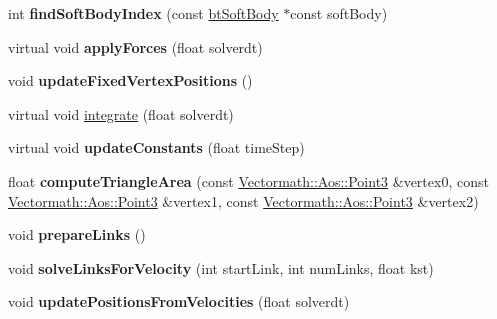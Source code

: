 \begin{DoxyCompactItemize}
\mbox{\label{classbtOpenCLSoftBodySolver_ab9279cc2d59f750669cfdb1169cfd72d}} 
int {\bfseries find\+Soft\+Body\+Index} (const \hyperlink{classbtSoftBody}{bt\+Soft\+Body} $\ast$const soft\+Body)
\item 
\mbox{\label{classbtOpenCLSoftBodySolver_af4eb320227e2c64215d1f9e81e8f4f6c}} 
virtual void {\bfseries apply\+Forces} (float solverdt)
\item 
\mbox{\label{classbtOpenCLSoftBodySolver_a8ebe65eba18e313891c8b7d9894f1a07}} 
void {\bfseries update\+Fixed\+Vertex\+Positions} ()
\item 
virtual void \hyperlink{classbtOpenCLSoftBodySolver_ad52983f1059032ef7f89416442cc911c}{integrate} (float solverdt)
\item 
\mbox{\label{classbtOpenCLSoftBodySolver_a9533c30551e72b99ebf7327b8001cf3e}} 
virtual void {\bfseries update\+Constants} (float time\+Step)
\item 
\mbox{\label{classbtOpenCLSoftBodySolver_af5a6006337ca96e942876b52be7b7763}} 
float {\bfseries compute\+Triangle\+Area} (const \hyperlink{classVectormath_1_1Aos_1_1Point3}{Vectormath\+::\+Aos\+::\+Point3} \&vertex0, const \hyperlink{classVectormath_1_1Aos_1_1Point3}{Vectormath\+::\+Aos\+::\+Point3} \&vertex1, const \hyperlink{classVectormath_1_1Aos_1_1Point3}{Vectormath\+::\+Aos\+::\+Point3} \&vertex2)
\item 
\mbox{\label{classbtOpenCLSoftBodySolver_aed3065d7877dc780cf89fcf777d255ba}} 
void {\bfseries prepare\+Links} ()
\item 
\mbox{\label{classbtOpenCLSoftBodySolver_ac1a2fbaa31b4caa8c5ff362f6d0b3473}} 
void {\bfseries solve\+Links\+For\+Velocity} (int start\+Link, int num\+Links, float kst)
\item 
\mbox{\label{classbtOpenCLSoftBodySolver_a72f132c1c1fb8646399798aa05550f1a}} 
void {\bfseries update\+Positions\+From\+Velocities} (float solverdt)
\item 
\mbox{\label{classbtOpenCLSoftBodySolver_a2ef8c98048547710bfc06bfd16d1c0e6}} 

\end{DoxyCompactItemize}
